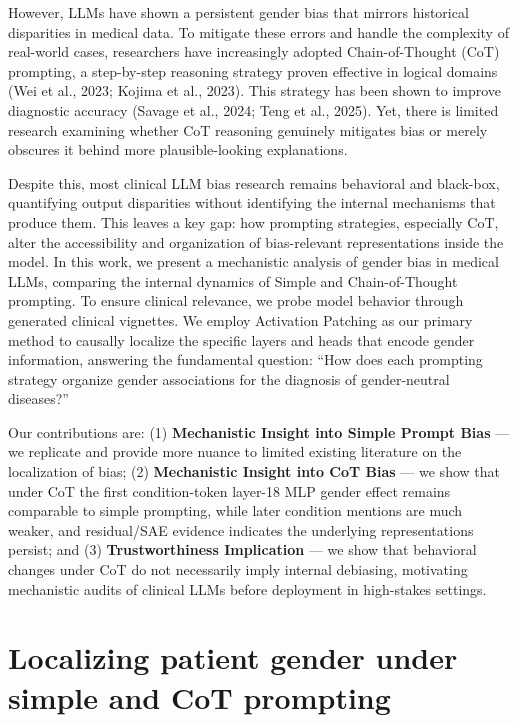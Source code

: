 \documentclass{article}
\begin{document}
However, LLMs have shown a persistent gender bias that mirrors historical disparities in medical data. To mitigate these errors and handle the complexity of real-world cases, researchers have increasingly adopted Chain-of-Thought (CoT) prompting, a step-by-step reasoning strategy proven effective in logical domains (Wei et al., 2023; Kojima et al., 2023). This strategy has been shown to improve diagnostic accuracy (Savage et al., 2024; Teng et al., 2025). Yet, there is limited research examining whether CoT reasoning genuinely mitigates bias or merely obscures it behind more plausible-looking explanations.

Despite this, most clinical LLM bias research remains behavioral and black-box, quantifying output disparities without identifying the internal mechanisms that produce them. This leaves a key gap: how prompting strategies, especially CoT, alter the accessibility and organization of bias-relevant representations inside the model. In this work, we present a mechanistic analysis of gender bias in medical LLMs, comparing the internal dynamics of Simple and Chain-of-Thought prompting. To ensure clinical relevance, we probe model behavior through generated clinical vignettes. We employ Activation Patching as our primary method to causally localize the specific layers and heads that encode gender information, answering the fundamental question: ``How does each prompting strategy organize gender associations for the diagnosis of gender-neutral diseases?''

Our contributions are: (1) \textbf{Mechanistic Insight into Simple Prompt Bias} --- we replicate and provide more nuance to limited existing literature on the localization of bias; (2) \textbf{Mechanistic Insight into CoT Bias} --- we show that under CoT the first condition-token layer-18 MLP gender effect remains comparable to simple prompting, while later condition mentions are much weaker, and residual/SAE evidence indicates the underlying representations persist; and (3) \textbf{Trustworthiness Implication} --- we show that behavioral changes under CoT do not necessarily imply internal debiasing, motivating mechanistic audits of clinical LLMs before deployment in high-stakes settings.


\section{Localizing patient gender under simple and CoT prompting}
\end{document}
